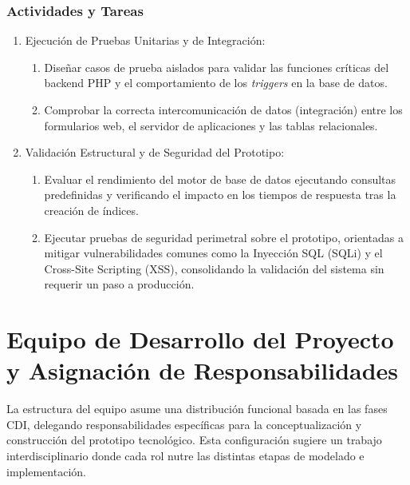 \subsubsection{Actividades y Tareas}
\begin{enumerate}
	\item Ejecución de Pruebas Unitarias y de Integración:
	\begin{enumerate}
		\item Diseñar casos de prueba aislados para validar las funciones críticas del backend PHP y el comportamiento de los \textit{triggers} en la base de datos.
		\item Comprobar la correcta intercomunicación de datos (integración) entre los formularios web, el servidor de aplicaciones y las tablas relacionales.
	\end{enumerate}
	\item Validación Estructural y de Seguridad del Prototipo:
	\begin{enumerate}
		\item Evaluar el rendimiento del motor de base de datos ejecutando consultas predefinidas y verificando el impacto en los tiempos de respuesta tras la creación de índices.
		\item Ejecutar pruebas de seguridad perimetral sobre el prototipo, orientadas a mitigar vulnerabilidades comunes como la Inyección SQL (SQLi) y el Cross-Site Scripting (XSS), consolidando la validación del sistema sin requerir un paso a producción.
	\end{enumerate}
\end{enumerate}

\section[Equipo de Trabajo]{Equipo de Desarrollo del Proyecto y Asignación de Responsabilidades}\label{equipo}

La estructura del equipo asume una distribución funcional basada en las fases CDI, delegando responsabilidades específicas para la conceptualización y construcción del prototipo tecnológico. Esta configuración sugiere un trabajo interdisciplinario donde cada rol nutre las distintas etapas de modelado e implementación.

